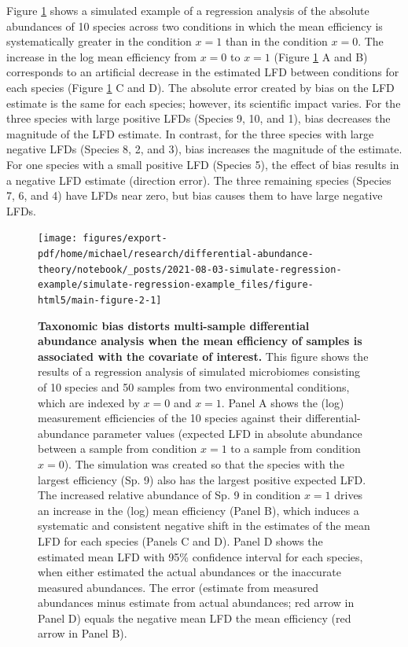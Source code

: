 \documentclass[
]{article}
\begin{document}
Figure \ref{fig:regression-example} shows a simulated example of a regression analysis of the absolute abundances of 10 species across two conditions in which the mean efficiency is systematically greater in the condition \(x=1\) than in the condition \(x=0\).
The increase in the log mean efficiency from \(x=0\) to \(x=1\) (Figure \ref{fig:regression-example} A and B) corresponds to an artificial decrease in the estimated LFD between conditions for each species (Figure \ref{fig:regression-example} C and D).
The absolute error created by bias on the LFD estimate is the same for each species; however, its scientific impact varies.
For the three species with large positive LFDs (Species 9, 10, and 1), bias decreases the magnitude of the LFD estimate.
In contrast, for the three species with large negative LFDs (Species 8, 2, and 3), bias increases the magnitude of the estimate.
For one species with a small positive LFD (Species 5), the effect of bias results in a negative LFD estimate (direction error).
The three remaining species (Species 7, 6, and 4) have LFDs near zero, but bias causes them to have large negative LFDs.

\begin{figure}
\texttt{[image: figures/export-pdf/home/michael/research/differential-abundance-theory/notebook/\_posts/2021-08-03-simulate-regression-example/simulate-regression-example\_files/figure-html5/main-figure-2-1]} \caption{\textbf{Taxonomic bias distorts multi-sample differential abundance analysis when the mean efficiency of samples is associated with the covariate of interest.} This figure shows the results of a regression analysis of simulated microbiomes consisting of 10 species and 50 samples from two environmental conditions, which are indexed by \(x=0\) and \(x=1\). Panel A shows the (log) measurement efficiencies of the 10 species against their differential-abundance parameter values (expected LFD in absolute abundance between a sample from condition \(x=1\) to a sample from condition \(x=0\)). The simulation was created so that the species with the largest efficiency (Sp. 9) also has the largest positive expected LFD. The increased relative abundance of Sp. 9 in condition \(x=1\) drives an increase in the (log) mean efficiency (Panel B), which induces a systematic and consistent negative shift in the estimates of the mean LFD for each species (Panels C and D). Panel D shows the estimated mean LFD with 95\% confidence interval for each species, when either estimated the actual abundances or the inaccurate measured abundances. The error (estimate from measured abundances minus estimate from actual abundances; red arrow in Panel D) equals the negative mean LFD the mean efficiency (red arrow in Panel B).}\label{fig:regression-example}
\end{figure}
\end{document}
